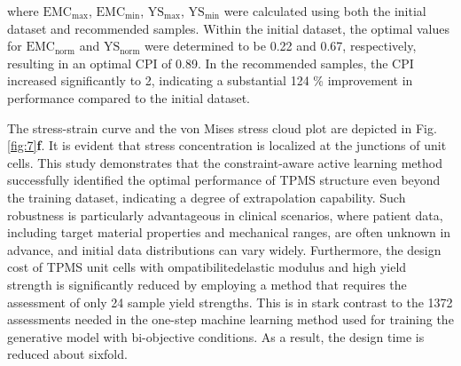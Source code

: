 \documentclass[preprint,review,12pt,authoryear]{elsarticle}
\begin{document}
where $\text{EMC}_\text{max}$, $\text{EMC}_\text{min}$, $\text{YS}_\text{max}$, $\text{YS}_\text{min}$ were calculated using both the initial dataset and recommended samples. Within the initial dataset, the optimal values for $\text{EMC}_\text{norm}$ and $\text{YS}_\text{norm}$ were determined to be 0.22 and 0.67, respectively, resulting in an optimal CPI of 0.89. In the recommended samples, the CPI increased significantly to 2, indicating a substantial 124 \% improvement in performance compared to the initial dataset.

The stress-strain curve and the von Mises stress cloud plot are depicted in Fig. \ref{fig:7}\textbf{f}. It is evident that stress concentration is localized at the junctions of unit cells. This study demonstrates that the constraint-aware active learning method successfully identified the optimal performance of TPMS structure even beyond the training dataset, indicating a degree of extrapolation capability. Such robustness is particularly advantageous in clinical scenarios, where patient data, including target material properties and mechanical ranges, are often unknown in advance, and initial data distributions can vary widely. Furthermore, the design cost of TPMS unit cells with ompatibilitedelastic modulus and high yield strength is significantly reduced by employing a method that requires the assessment of only 24 sample yield strengths. This is in stark contrast to the 1372 assessments needed in the one-step machine learning method used for training the generative model with bi-objective conditions. As a result, the design time is reduced about sixfold.
\end{document}
